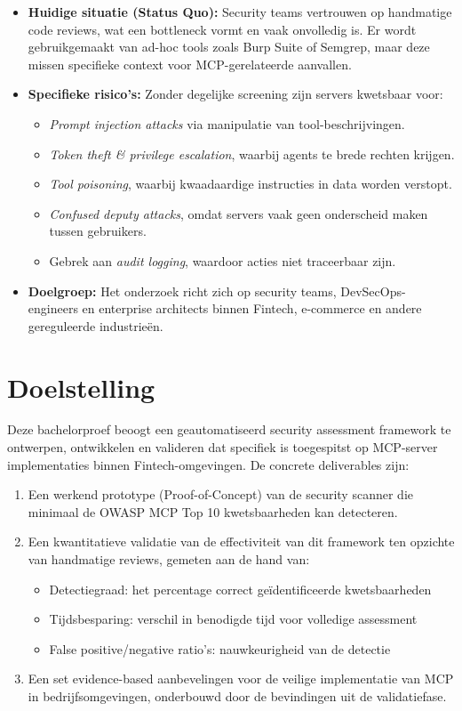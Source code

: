 \begin{itemize}
    \item \textbf{Huidige situatie (Status Quo):} Security teams vertrouwen op handmatige code reviews, wat een bottleneck vormt en vaak onvolledig is. Er wordt gebruikgemaakt van ad-hoc tools zoals Burp Suite of Semgrep, maar deze missen specifieke context voor MCP-gerelateerde aanvallen.
    \item \textbf{Specifieke risico's:} Zonder degelijke screening zijn servers kwetsbaar voor:
    \begin{itemize}
        \item \emph{Prompt injection attacks} via manipulatie van tool-beschrijvingen.
        \item \emph{Token theft \& privilege escalation}, waarbij agents te brede rechten krijgen.
        \item \emph{Tool poisoning}, waarbij kwaadaardige instructies in data worden verstopt.
        \item \emph{Confused deputy attacks}, omdat servers vaak geen onderscheid maken tussen gebruikers.
        \item Gebrek aan \emph{audit logging}, waardoor acties niet traceerbaar zijn.
    \end{itemize}
    \item \textbf{Doelgroep:} Het onderzoek richt zich op security teams, DevSecOps-engineers en enterprise architects binnen Fintech, e-commerce en andere gereguleerde industrieën.
\end{itemize}

\section{Doelstelling}
\label{sec:doelstelling}

Deze bachelorproef beoogt een geautomatiseerd security assessment framework te ontwerpen, ontwikkelen en valideren dat specifiek is toegespitst op MCP-server implementaties binnen Fintech-omgevingen. De concrete deliverables zijn:
\begin{enumerate}
    \item Een werkend prototype (Proof-of-Concept) van de security scanner die minimaal de OWASP MCP Top 10 kwetsbaarheden kan detecteren.
    \item Een kwantitatieve validatie van de effectiviteit van dit framework ten opzichte van handmatige reviews, gemeten aan de hand van:
    \begin{itemize}
        \item Detectiegraad: het percentage correct geïdentificeerde kwetsbaarheden
        \item Tijdsbesparing: verschil in benodigde tijd voor volledige assessment
        \item False positive/negative ratio's: nauwkeurigheid van de detectie
    \end{itemize}
    \item Een set evidence-based aanbevelingen voor de veilige implementatie van MCP in bedrijfsomgevingen, onderbouwd door de bevindingen uit de validatiefase.
\end{enumerate}

